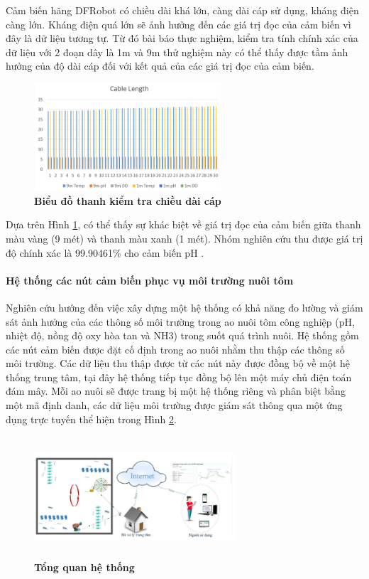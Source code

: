 \documentclass{article} %
\begin{document}
\begin{itemize}
		Cảm biến hãng DFRobot có chiều dài khá lớn, càng dài cáp sử dụng, kháng điện càng lớn. Kháng điện quá lớn sẽ ảnh hưởng đến các giá trị đọc của cảm biến vì đây là dữ liệu tương tự. Từ đó bài báo thực nghiệm, kiểm tra tính chính xác của dữ liệu với 2 đoạn dây là 1m và 9m thử nghiệm này có thể thấy được tầm ảnh hưởng của độ dài cáp đối với kết quả của các giá trị đọc của cảm biến.
		\begin{figure}[!ht]
			\centering
			\includegraphics[width=7cm,height=4cm]{Images/ktcap.png}
			\caption[Biểu đồ thanh kiểm tra chiều dài cáp\cite{zaini2020data}]{\bfseries \fontsize{12pt}{0pt}\selectfont Biểu đồ thanh kiểm tra chiều dài cáp\cite{zaini2020data}}
			\label{ktcap}
		\end{figure}  
	\end{itemize}
	
	Dựa trên Hình \ref{ktcap}, có thể thấy sự khác biệt về giá trị đọc của cảm biến giữa thanh màu vàng (9 mét) và thanh màu xanh (1 mét). Nhóm nghiên cứu thu được giá trị độ chính xác là 99.90461\% cho cảm biến pH \cite{zaini2020data}. 
	
	\paragraph{Hệ thống các nút cảm biến phục vụ môi trường nuôi tôm}\mbox{}
	
	Nghiên cứu \cite{khanhhe} hướng đến việc xây dựng một hệ thống có khả năng đo lường và giám sát ảnh hưởng của các thông số môi trường trong ao nuôi tôm công nghiệp (pH, nhiệt độ, nồng độ oxy hòa tan và NH3) trong suốt quá trình nuôi. Hệ thống gồm các nút cảm biến được đặt cố định trong ao nuôi nhằm thu thập các thông số môi trường. Các dữ liệu thu thập được từ các nút này được đồng bộ về một hệ  thống trung tâm, tại đây hệ thống tiếp  tục đồng bộ lên một máy chủ điện toán đám mây. Mỗi ao nuôi sẽ được trang bị một hệ thống riêng và phân biệt bằng một mã định danh, các dữ liệu môi trường được giám sát thông qua một ứng dụng trực tuyến thể hiện trong Hình \ref{TQht}.
	\begin{figure}[!ht]
		\centering
		\includegraphics[width=7.5cm,height=4.5cm]{Images/TQht.png}
		\caption[Tổng quan hệ thống \cite{khanhhe}]{\bfseries \fontsize{12pt}{0pt}\selectfont Tổng quan hệ thống\cite{khanhhe}}
		\label{TQht}
	\end{figure}  
	
\end{document}
